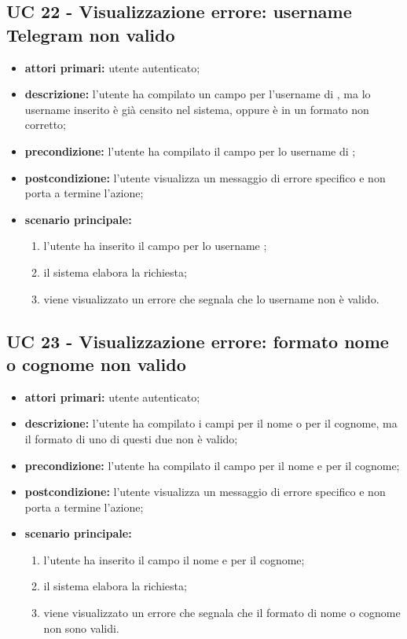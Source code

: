 
		\subsection{UC 22 - Visualizzazione errore: username Telegram non valido}
		\begin{itemize}
			\item \textbf{attori primari:} utente autenticato;
			\item \textbf{descrizione:} l'utente ha compilato un campo per l'username di , ma lo username inserito è già censito nel sistema, oppure è in un formato non corretto;
			\item \textbf{precondizione:} l'utente ha compilato il campo per lo username di ;
			\item \textbf{postcondizione:} l'utente visualizza un messaggio di errore specifico e non porta a termine l'azione;
			\item \textbf{scenario principale:}
			\begin{enumerate}
				\item l'utente ha inserito il campo per lo username ;
				\item il sistema elabora la richiesta;
				\item viene visualizzato un errore che segnala che lo username  non è valido.
			\end{enumerate}
		\end{itemize}



		\subsection{UC 23 - Visualizzazione errore: formato nome o cognome non valido}
		\begin{itemize}
			\item \textbf{attori primari:} utente autenticato;
			\item \textbf{descrizione:} l'utente ha compilato i campi per il nome o per il cognome, ma il formato di uno di questi due non è valido;
			\item \textbf{precondizione:} l'utente ha compilato il campo per il nome e per il cognome;
			\item \textbf{postcondizione:} l'utente visualizza un messaggio di errore specifico e non porta a termine l'azione;
			\item \textbf{scenario principale:}
			\begin{enumerate}
				\item l'utente ha inserito il campo il nome e per il cognome;
				\item il sistema elabora la richiesta;
				\item viene visualizzato un errore che segnala che il formato di nome o cognome non sono validi.
			\end{enumerate}
		\end{itemize}

